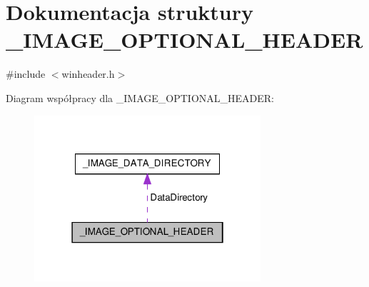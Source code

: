 \hypertarget{struct___i_m_a_g_e___o_p_t_i_o_n_a_l___h_e_a_d_e_r}{\section{Dokumentacja struktury \-\_\-\-I\-M\-A\-G\-E\-\_\-\-O\-P\-T\-I\-O\-N\-A\-L\-\_\-\-H\-E\-A\-D\-E\-R}
\label{struct___i_m_a_g_e___o_p_t_i_o_n_a_l___h_e_a_d_e_r}
}


{\ttfamily \#include $<$winheader.\-h$>$}



Diagram współpracy dla \-\_\-\-I\-M\-A\-G\-E\-\_\-\-O\-P\-T\-I\-O\-N\-A\-L\-\_\-\-H\-E\-A\-D\-E\-R\-:\nopagebreak
\begin{figure}[H]
\begin{center}
\leavevmode
\includegraphics[width=238pt]{struct___i_m_a_g_e___o_p_t_i_o_n_a_l___h_e_a_d_e_r__coll__graph}
\end{center}
\end{figure}
